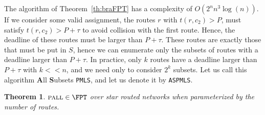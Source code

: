 \documentclass[a4paper,10pt]{journal}
\newcommand\PMLS{\texttt{PMLS}\xspace}
\newcommand\ASPMLS{\texttt{ASPMLS}\xspace}
\newtheorem{theorem}{Theorem}
\newcommand\pall{\textsc{pall}\xspace}
\begin{document}
The algorithm of Theorem~\ref{th:braFPT} has a complexity of $O(2^nn^3\log(n))$. If we consider some valid assignment, the routes $r$ with $t(r,c_2) > P$, must satisfy $t(r,c_2) > P + \tau$ to avoid collision with the first route. Hence, the deadline of these routes must be larger than $P + \tau$. These routes are exactly those that must be put in $S$, hence we can enumerate only the subsets of routes with a deadline larger than $P + \tau$. In practice, only $k$ routes have a deadline larger than $P + \tau$ with $k << n$, and we need only to consider $2^k$ subsets. Let us call this algorithm \textbf{A}ll \textbf{S}ubsets \PMLS, and let us denote it by \ASPMLS.


\begin{theorem}\label{th:pallFPT}
$\pall \in \FPT$ over star routed networks when parameterized by the number of routes.
\end{theorem}
\end{document}
